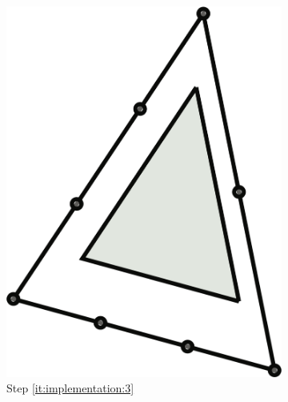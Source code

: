 \begin{figure}
\begin{subfigure}[b]{0.18\columnwidth}
		\includegraphics[width=\textwidth]{content/img/implementation/tessellation_3.png}
		\caption{Step \ref{it:implementation:3}}
		\label{fig:implementation:step:3}
	\end{subfigure}		
	\begin{subfigure}[b]{0.18\columnwidth}
		\centering

\end{subfigure}
\end{figure}
